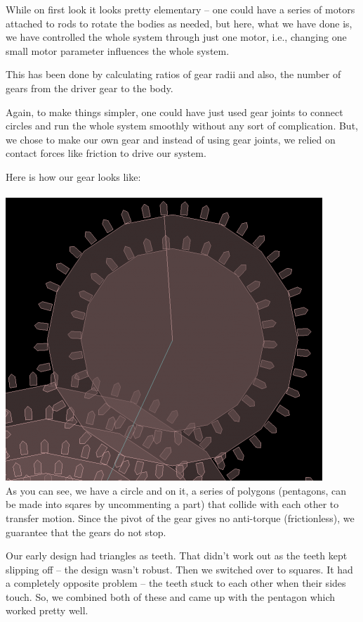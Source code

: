 \documentclass[12pt]{report}
\begin{document}
While on first look it looks pretty elementary -- one could have a series of motors attached to rods to rotate the bodies as needed, but here, what we have done is, we have controlled the whole system through just one motor, i.e., changing one small motor parameter influences the whole system.

This has been done by calculating ratios of gear radii and also, the number of gears from the driver gear to the body.

Again, to make things simpler, one could have just used gear joints to connect circles and run the whole system smoothly without any sort of complication. But, we chose to make our own gear and instead of using gear joints, we relied on contact forces like friction to drive our system.

Here is how our gear looks like:
\\ \\
\includegraphics[scale=0.4]{./img/gear.png}
\\
As you can see, we have a circle and on it, a series of polygons (pentagons, can be made into sqares by uncommenting a part) that collide with each other to transfer motion. Since the pivot of the gear gives no anti-torque (frictionless), we guarantee that the gears do not stop. 

Our early design had triangles as teeth. That didn't work out as the teeth kept slipping off -- the design wasn't robust. Then we switched over to squares. It had a completely opposite problem -- the teeth stuck to each other when their sides touch. So, we combined both of these and came up with the pentagon which worked pretty well.
\pagebreak
\end{document}
